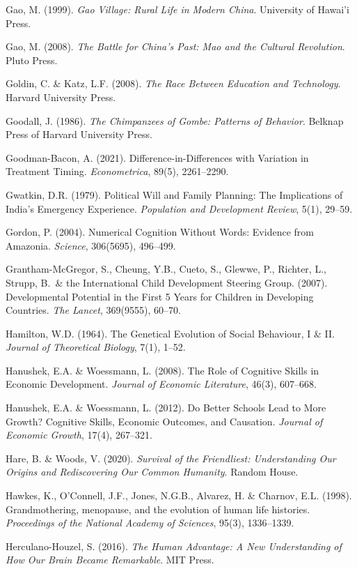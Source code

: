\documentclass[12pt,letterpaper]{article}
\begin{document}
Gao, M. (1999). \emph{Gao Village: Rural Life in Modern China}.
University of Hawai'i Press.

Gao, M. (2008). \emph{The Battle for China's Past: Mao and the Cultural
Revolution}. Pluto Press.

Goldin, C. \& Katz, L.F. (2008). \emph{The Race Between Education and
Technology}. Harvard University Press.

Goodall, J. (1986). \emph{The Chimpanzees of Gombe: Patterns of
Behavior}. Belknap Press of Harvard University Press.

Goodman-Bacon, A. (2021). Difference-in-Differences with Variation in
Treatment Timing. \emph{Econometrica}, 89(5), 2261--2290.

Gwatkin, D.R. (1979). Political Will and Family Planning: The
Implications of India's Emergency Experience. \emph{Population and
Development Review}, 5(1), 29--59.

Gordon, P. (2004). Numerical Cognition Without Words: Evidence from
Amazonia. \emph{Science}, 306(5695), 496--499.

Grantham-McGregor, S., Cheung, Y.B., Cueto, S., Glewwe, P., Richter,
L., Strupp, B.\ \& the International Child Development Steering Group.
(2007). Developmental Potential in the First 5 Years for Children in
Developing Countries. \emph{The Lancet}, 369(9555), 60--70.

Hamilton, W.D. (1964). The Genetical Evolution of Social Behaviour, I
\& II. \emph{Journal of Theoretical Biology}, 7(1), 1--52.

Hanushek, E.A. \& Woessmann, L. (2008). The Role of Cognitive Skills in
Economic Development. \emph{Journal of Economic Literature}, 46(3),
607--668.

Hanushek, E.A. \& Woessmann, L. (2012). Do Better Schools Lead to More
Growth? Cognitive Skills, Economic Outcomes, and Causation.
\emph{Journal of Economic Growth}, 17(4), 267--321.

Hare, B. \& Woods, V. (2020). \emph{Survival of the Friendliest:
Understanding Our Origins and Rediscovering Our Common Humanity}.
Random House.

Hawkes, K., O'Connell, J.F., Jones, N.G.B., Alvarez, H. \& Charnov, E.L.
(1998). Grandmothering, menopause, and the evolution of human life
histories. \emph{Proceedings of the National Academy of Sciences},
95(3), 1336--1339.

Herculano-Houzel, S. (2016). \emph{The Human Advantage: A New
Understanding of How Our Brain Became Remarkable}. MIT Press.
\end{document}
